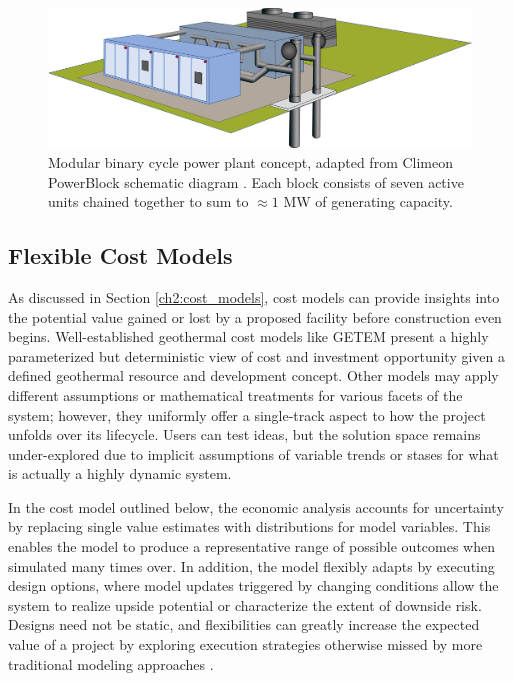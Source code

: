 \begin{figure}[!htp]
\centering
\includegraphics[width=\textwidth]{templates/images/Figure-Climeon-PowerBlock.png}
\caption[Modular power plant schematic]{Modular binary cycle power plant concept, adapted from Climeon PowerBlock schematic diagram \protect\citep{climeon_climeon_2021-1}. Each block consists of seven active units chained together to sum to $\approx1$ MW of generating capacity.}
\label{fig:climeon_powerblock}
\end{figure}

\subsection{Flexible Cost Models}\label{ch4:flex_models}

As discussed in Section \ref{ch2:cost_models}, cost models can provide insights into the potential value gained or lost by a proposed facility before construction even begins. Well-established geothermal cost models like GETEM \citep{entingh_volume_2006} present a highly parameterized but deterministic view of cost and investment opportunity given a defined geothermal resource and development concept. Other models may apply different assumptions or mathematical treatments for various facets of the system; however, they uniformly offer a single-track aspect to how the project unfolds over its lifecycle. Users can test ideas, but the solution space remains under-explored due to implicit assumptions of variable trends or stases for what is actually a highly dynamic system.

In the cost model outlined below, the economic analysis accounts for uncertainty by replacing single value estimates with distributions for model variables. This enables the model to produce a representative range of possible outcomes when simulated many times over. In addition, the model flexibly adapts by executing design options, where model updates triggered by changing conditions allow the system to realize upside potential or characterize the extent of downside risk. Designs need not be static, and flexibilities can greatly increase the expected value of a project by exploring execution strategies otherwise missed by more traditional modeling approaches \citep[Chapter 6]{de_neufville_flexibility_2011}.

